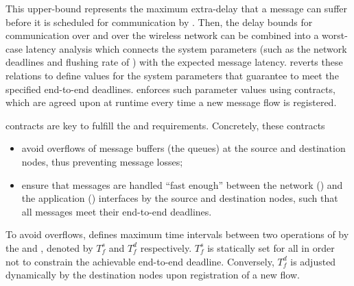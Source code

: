 \squarepar{%
  \blink provides real-time guarantees between the network interfaces (\ie the \CPs) assuming periodic message release. \DRP handles the mismatch between the \blink assumptions and the actual message arrival at the \CPs by
  (i)~letting the host \emph{assume} that messages are indeed released periodically at the \CPs.
    \blink's communication schedule is computed based on the expected arrival pattern and using an arbitrary initial phase for the flows.
  (ii)~analyzing the maximal mismatch between the actual and expected arrival patterns.%
}

This upper-bound represents the maximum extra-delay that a message can suffer before it is scheduled for communication by \blink.
Then, the delay bounds for communication over \bolt and over the wireless network can be combined into a worst-case latency analysis which connects the system parameters (such as the network deadlines and flushing rate of \bolt) with the expected message latency.
\DRP reverts these relations to define values for the system parameters
that guarantee to meet the specified end-to-end deadlines.
\DRP enforces such parameter values using contracts, which are agreed upon at runtime every time a new message flow is registered.

\DRP contracts are key to fulfill the  and  requirements. Concretely, these contracts
\begin{itemize}[nosep]
  \item avoid overflows of message buffers (\eg the \bolt queues) at the source and destination nodes, thus preventing message losses;
  \item ensure that messages are handled ``fast enough'' between the network (\ie \CPs) and the application (\ie \APs) interfaces by the source and destination nodes, such that all messages meet their end-to-end deadlines.
\end{itemize}

To avoid overflows, \DRP defines {maximum time intervals} between two \opflush operations of \bolt by the \CPs and \APs, denoted by $T_f^s$ and $T_f^d$ respectively.
$T_f^s$ is statically set for all \CPs in order not to constrain the achievable end-to-end deadline.
Conversely, $T_f^d$ is adjusted dynamically by the destination nodes upon registration of a new flow.

